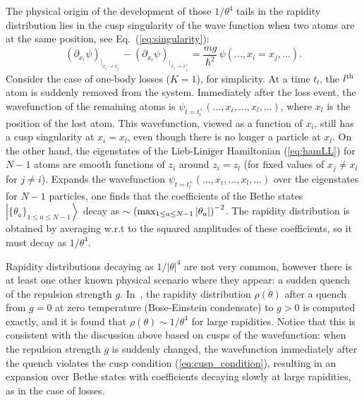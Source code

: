 \documentclass[onecolumn,amsfonts,showpacs,superscriptaddress]{revtex4-1}
\newcommand{\comJ}[1]{{\color{orange}#1}}
\begin{document}
The physical origin of the development of those $1/\theta^4$ tails in the rapidity distribution lies in the cusp singularity of the wave function when two atoms are at the same position, see Eq.~(\ref{eq:singularity}):
\begin{equation}
    \label{eq:cusp_condition}
    (\partial_{x_i} \psi )_{|_{x_i\rightarrow x_j^-}}-( \partial_{x_i} \psi) _{|_{x_i\rightarrow x_j^+}}
= \frac{mg}{\hbar^2} \,\psi(\dots,x_i=x_j,\dots). 
\end{equation}
Consider the case of one-body losses ($K=1$), for simplicity. At a time $t_l$, the $l^{\rm th}$ atom is suddenly removed from the system. Immediately after the loss event, the wavefunction of the remaining atoms is $\psi_{t=t_l^+}(\dots, x_i,  \dots, x_l, \dots)$, where $x_l$ is the position of the lost atom. This wavefunction, viewed as a function of $x_i$, still has a cusp singularity at $x_i = x_l$, even though there is no longer a particle at $x_l$. On the other hand, the  eigenstates of the Lieb-Liniger Hamiltonian (\ref{eq:hamLL}) for $N-1$ atoms are smooth functions of $z_i$ around $z_i=z_l$ (for fixed values of $x_j \neq x_l$ for $j\neq i$). Expands the wavefunction $\psi_{t=t_l^+}(\dots, x_i, \dots, x_l, \dots)$ over the eigenstates for $N-1$ particles, one finds that the coefficients of the Bethe states $\left| \{ \theta_a \}_{1 \leq a \leq N-1} \right>$ decay as $\sim \left( {\rm max}_{ 1 \leq a \leq N-1 } \, | \theta_a |  \right)^{-2}$. The rapidity distribution is obtained by averaging w.r.t to the squared amplitudes of these coefficients, so it must decay as $1/\theta^4$.

Rapidity distributions decaying as $1/|\theta|^4$ are not very common, however there is at least one other known physical scenario where they appear: a sudden quench of the repulsion strength $g$. In~\citep{de2014solution}, the rapidity distribution $\rho(\theta)$ after a quench from $g=0$ at zero temperature (Bose-Einstein condensate) to $g>0$ is computed exactly, and it is found that $\rho(\theta) \sim 1/ \theta^4$ for large rapidities. Notice that this is consistent with the discussion above based on cusps of the wavefunction: when the repulsion strength $g$ is suddenly changed, the wavefunction immediately after the quench  violates the cusp condition (\ref{eq:cusp_condition}),  resulting in an expansion over Bethe states with coefficients decaying slowly at large rapidities, as in the case of losses.


\end{document}
